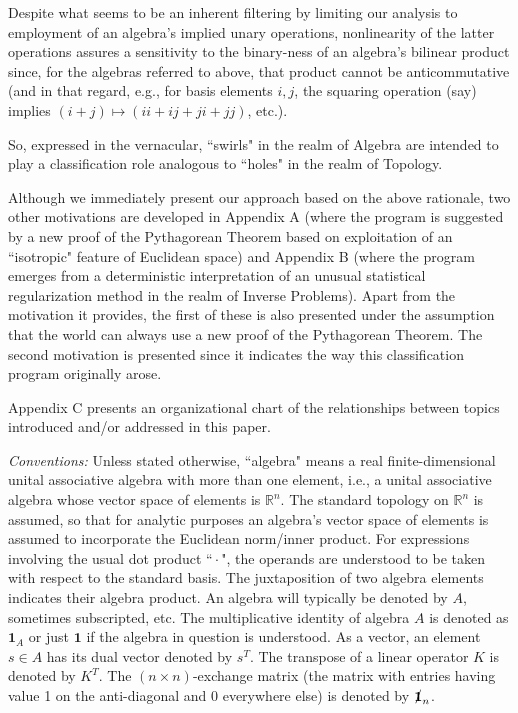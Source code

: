 \documentclass{amsart}
\numberwithin{equation}{section}
\theoremstyle{definition}
\numberwithin{theorem}{section}
\begin{document}
Despite what seems to be an inherent filtering by limiting our analysis to employment of an algebra's implied unary operations, nonlinearity of the latter operations assures a sensitivity to the binary-ness of an algebra's bilinear product since, for the algebras referred to above, that product cannot be anticommutative (and in that regard, e.g., for basis elements $i,j$, the squaring operation (say) implies $(i+j)\mapsto (ii+ij+ji+jj)$, etc.).  

So, expressed in the vernacular, ``swirls" in the realm of Algebra are intended to play a classification role analogous to ``holes" in the realm of Topology.
  
 Although we immediately present our approach based on the above rationale, two other motivations are developed in Appendix A (where the program is suggested by a new proof of the Pythagorean Theorem based on exploitation of an ``isotropic" feature of Euclidean space) and Appendix B (where the program emerges from a deterministic interpretation of an unusual statistical regularization method in the realm of Inverse Problems).  Apart from the motivation it provides, the first of these is also presented under the assumption that the world can always use a new proof of the Pythagorean Theorem.  The second motivation is presented since it indicates the way this classification program originally arose.

            Appendix C presents an organizational chart of the relationships between topics introduced and/or addressed in this paper.     

\bigskip
 
 {\it Conventions:}   Unless stated otherwise, ``algebra" means a real finite-dimensional unital associative algebra with more than one element, i.e., a unital associative algebra whose vector space of elements is $\mathbb{R}^n$. The standard topology on $\mathbb{R}^n$ is assumed, so that for analytic purposes an algebra's vector space of elements is assumed to incorporate the Euclidean norm/inner product.  For expressions involving the usual dot product ``\,$\cdot$\,", the operands are understood to be taken with respect to the standard basis. The juxtaposition of two algebra elements indicates their algebra product.   An algebra will typically be denoted by $A$, sometimes subscripted, etc. The multiplicative identity of algebra $A$ is denoted as $\mathbf{1}_A$ or just $\mathbf{1}$ if the algebra in question is understood.   As a vector, an element $s\in A$ has its dual vector denoted by $s^T$.  The transpose of a linear operator $K$ is denoted by $K^T$.  The $(n\times n)$-exchange matrix (the matrix with entries having value 1 on the anti-diagonal and 0 everywhere else) is denoted by  $\slashed{\bf 1}_n$.             
       
\end{document}
